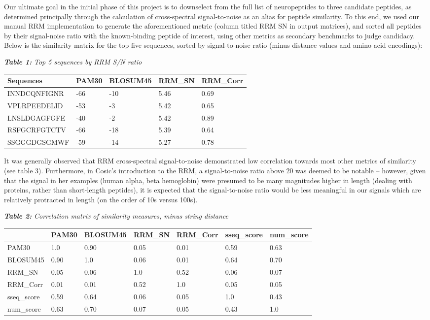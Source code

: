 \documentclass[]{article}
\begin{document}
Our ultimate goal in the initial phase of this project is to downselect from the full list of neuropeptides to three candidate peptides, as determined principally through the calculation of cross-spectral signal-to-noise as an alias for peptide similarity. To this end, we used our manual RRM implementation to generate the aforementioned metric (column titled RRM SN in output matrices), and sorted all peptides by their signal-noise ratio with the known-binding peptide of interest, using other metrics as secondary benchmarks to judge candidacy. Below is the similarity matrix for the top five sequences, sorted by signal-to-noise ratio (minus distance values and amino acid encodings):


\textbf{\emph{Table 1:}} \emph{Top 5 sequences by RRM S/N ratio}
\begin{longtable}[]{lllll}
\toprule
\textbf{Sequences}& PAM30 & BLOSUM45 & RRM\_SN & RRM\_Corr  \tabularnewline
\midrule
\endhead
INNDCQNFIGNR & -66   & -10      & 5.46    & 0.69 \\
VPLRPEEDELID & -53   & -3       & 5.42    & 0.65  \\
LNSLDGAGFGFE & -40   & -2       & 5.42    & 0.89  \\
RSFGCRFGTCTV & -66   & -18      & 5.39    & 0.64  \\
SSGGGDGSGMWF & -59   & -14      & 5.27    & 0.78 \\             
\end{longtable}

It was generally observed that RRM cross-spectral signal-to-noise demonstrated low correlation towards most other metrics of similarity (see table 3). Furthermore, in Cosic's introduction to the RRM, a signal-to-noise ratio above 20 was deemed to be notable -- however, given that the signal in her examples (human alpha, beta hemoglobin) were presumed to be many magnitudes higher in length (dealing with proteins, rather than short-length peptides), it is expected that the signal-to-noise ratio would be less meaningful in our signals which are relatively protracted in length (on the order of 10s versus 100s).

\begin{center}
\textbf{\emph{Table 2:}} \emph{Correlation matrix of similarity measures, minus string distance}
\begin{longtable}[]{lllllll}
\toprule
 & PAM30 & BLOSUM45 & RRM\_SN & RRM\_Corr & sseq\_score & num\_score \\
\midrule
\endhead
PAM30 & 1.0 & 0.90 & 0.05 & 0.01 & 0.59 & 0.63 \\
BLOSUM45 & 0.90 & 1.0 & 0.06 & 0.01 & 0.64 & 0.70 \\
RRM\_SN & 0.05 & 0.06 & 1.0 & 0.52 & 0.06 & 0.07 \\
RRM\_Corr & 0.01 & 0.01 & 0.52 & 1.0 & 0.05 & 0.05 \\
sseq\_score & 0.59 & 0.64 & 0.06 & 0.05 & 1.0 & 0.43 \\
num\_score & 0.63 & 0.70 & 0.07 & 0.05 & 0.43 & 1.0
\end{longtable}
\end{center}
\end{document}
